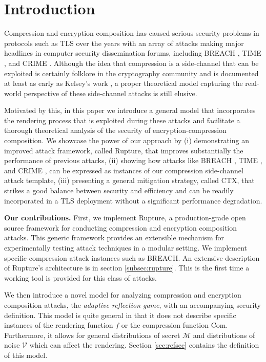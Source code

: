 \section{Introduction}\label{sec:prev}

Compression and encryption composition has caused serious security problems in
protocols such as TLS \cite{dierks2008tls} over the years with an array of
attacks making major headlines in computer security dissemination forums,
including BREACH \cite{gluck2013breach}, TIME \cite{be2013perfect}, and CRIME
\cite{duong2012crime}. Although the idea that compression is a side-channel that
can be exploited is certainly folklore in the cryptography community and is
documented at least as early as Kelsey's work \cite{kelsey2002compression}, a
proper theoretical model capturing the real-world perspective of these
side-channel attacks is still elusive.

Motivated by this, in this paper we introduce a general model that incorporates
the rendering process that is exploited during these attacks and facilitate a
thorough theoretical analysis of the security of encryption-compression
composition. We showcase the power of our approach by (i) demonstrating an
improved attack framework, called Rupture, that improves substantially the
performance of previous attacks, (ii) showing how attacks like BREACH
\cite{gluck2013breach}, TIME \cite{be2013perfect}, and CRIME
\cite{duong2012crime}, can be expressed as instances of our compression
side-channel attack template, (iii) presenting a general mitigation strategy,
called CTX, that strikes a good balance between security and efficiency and can
be readily incorporated in a TLS deployment without a significant performance
degradation.

\noindent
\textbf{Our contributions.} First, we implement Rupture\footnotemark[1], a production-grade open source
framework for conducting compression and encryption composition attacks.  This
generic framework provides an extensible mechanism for experimentally testing
attack techniques in a modular setting. We implement specific compression attack
instances such as BREACH. An extensive description of Rupture's architecture is
in section \ref{subsec:rupture}. This is the first time a working tool is
provided for this class of attacks.

We then introduce a novel model for analyzing compression and encryption
composition attacks, the \textit{adaptive reflection game}, with an accompanying
security definition. This model is quite general in that it does not describe
specific instances of the rendering function $f$ or the compression function
$\textrm{Com}$. Furthermore, it allows for general distributions of secret
$\mathcal{M}$ and distributions of noise $\mathcal{V}$ which can affect the
rendering. Section \ref{sec:refsec} contains the definition of this model.

